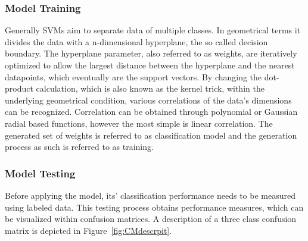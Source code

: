 \documentclass{article}
\begin{document}
\subsubsection{Model Training}
Generally SVMs aim to separate data of multiple classes. In geometrical terms it divides the data with a n-dimensional hyperplane, the so called decision boundary. The hyperplane parameter, also referred to as weights, are iteratively optimized to allow the largest distance between the hyperplane and the nearest datapoints, which eventually are the support vectors.  
By changing the dot-product calculation, which is also known as the kernel trick, within the underlying geometrical condition, various correlations of the data's dimensions can be recognized. Correlation can be obtained through polynomial or Gaussian radial based functions, however the most simple is linear correlation.
The generated set of weights is referred to as classification model and the generation process as such is referred to as training.\cite{kuhr2021}



\subsubsection{Model Testing}
Before applying the model, its' classification performance needs to be measured using labeled data. This testing process obtains performance measures, which can be visualized within confusion matrices. A description of a three class confusion matrix is depicted in Figure~\ref{fig:CMdescrpit}.\cite{kuhr2021}
\end{document}
